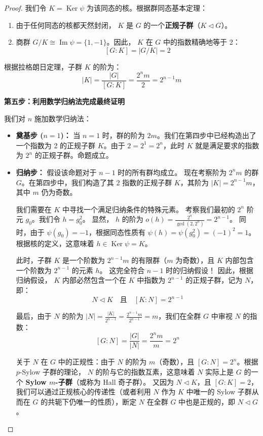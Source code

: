 \documentclass[]{article}
\begin{document}
\begin{proof}
我们令 $K = \operatorname{Ker}\psi$ 为该同态的核。根据群同态基本定理：
\begin{enumerate}
	\item 由于任何同态的核都天然封闭， $K$ 是 $G$ 的一个\textbf{正规子群}（$K \triangleleft G$）。
	\item 商群 $G/K \cong \operatorname{Im}\psi = \{1, -1\}$。因此， $K$ 在 $G$ 中的指数精确地等于 2：
	\[ [G:K] = |G/K| = 2 \]
\end{enumerate}
根据拉格朗日定理，子群 $K$ 的阶为：
\[ |K| = \frac{|G|}{[G:K]} = \frac{2^n m}{2} = 2^{n-1}m \]

\bigskip
\noindent \textbf{第五步：利用数学归纳法完成最终证明}

我们对 $n$ 施加数学归纳法：
\begin{itemize}
	\item \textbf{奠基步 ($n=1$)：}
	当 $n=1$ 时，群的阶为 $2m$。我们在第四步中已经构造出了一个指数为 2 的正规子群 $K$。由于 $2 = 2^1 = 2^n$，此时 $K$ 就是满足要求的指数为 $2^n$ 的正规子群。命题成立。
	
	\item \textbf{归纳步：}
	假设该命题对于 $n-1$ 时的所有群均成立。
	现在考察阶为 $2^n m$ 的群 $G$。在第四步中，我们构造了其 2 指数的正规子群 $K$，其阶为 $|K| = 2^{n-1}m$，其中 $m$ 仍为奇数。
	
	我们需要在 $K$ 中寻找一个满足归纳条件的特殊元素。
	考察我们最初的 $2^n$ 阶元 $g_0$。我们令 $h = g_0^2$。
	显然， $h$ 的阶为 $o(h) = \frac{2^n}{\gcd(2, 2^n)} = 2^{n-1}$。
	同时，由于 $\psi(g_0) = -1$，根据同态性质有 $\psi(h) = \psi(g_0^2) = (-1)^2 = 1$。根据核的定义，这意味着 $h \in \operatorname{Ker}\psi = K$。
	
	此时，子群 $K$ 是一个阶数为 $2^{n-1}m$ 的有限群（$m$ 为奇数），且 $K$ 内部包含一个阶数为 $2^{n-1}$ 的元素 $h$。
	这完全符合 $n-1$ 时的归纳假设！
	因此，根据归纳假设， $K$ 内部必然包含一个在 $K$ 中指数为 $2^{n-1}$ 的正规子群，记为 $N$，即：
	\[ N \triangleleft K \quad \text{且} \quad [K:N] = 2^{n-1} \]
	
	最后，由于 $N$ 的阶为 $|N| = \frac{|K|}{2^{n-1}} = \frac{2^{n-1}m}{2^{n-1}} = m$，我们在全群 $G$ 中审视 $N$ 的指数：
	\[ [G:N] = \frac{|G|}{|N|} = \frac{2^n m}{m} = 2^n \]
	
	关于 $N$ 在 $G$ 中的正规性：由于 $N$ 的阶为 $m$（奇数），且 $[G:N] = 2^n$。根据 $p$-Sylow 子群的理论， $N$ 的阶与它的指数互素，这意味着 $N$ 实际上是 $G$ 的一个 \textbf{Sylow $m$-子群}（或称为 Hall 奇子群）。
	又因为 $N \triangleleft K$，且 $[G:K]=2$，我们可以通过正规核心的传递性（或者利用 $N$ 作为 $K$ 中唯一的 Sylow 子群从而在 $G$ 的共轭下仍唯一的性质），断定 $N$ 在全群 $G$ 中也是正规的，即 $N \triangleleft G$。
\end{itemize}


\end{proof}
\end{document}
